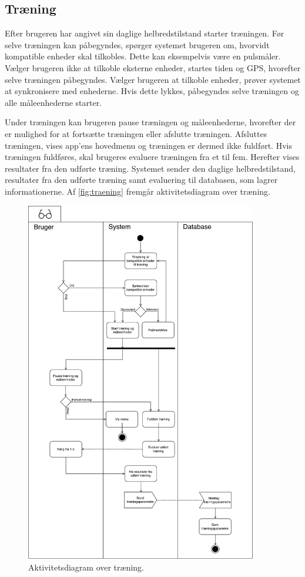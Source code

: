 \subsection{Træning} \label{sec:traening}
Efter brugeren har angivet sin daglige helbredstilstand starter træningen. Før selve træningen kan påbegyndes, spørger systemet brugeren om, hvorvidt kompatible enheder skal tilkobles. Dette kan eksempelvis være en pulsmåler. Vælger brugeren ikke at tilkoble eksterne enheder, startes tiden og GPS, hvorefter selve træningen påbegyndes. Vælger brugeren at tilkoble enheder, prøver systemet at synkronisere med enhederne.  Hvis dette lykkes, påbegyndes selve træningen og alle måleenhederne starter.

Under træningen kan brugeren pause træningen og måleenhederne, hvorefter der er mulighed for at fortsætte træningen eller afslutte træningen. Afsluttes træningen, vises app'ens hovedmenu og træningen er dermed ikke fuldført. 
Hvis træningen fuldføres, skal brugeres evaluere træningen fra et til fem. Herefter vises resultater fra den udførte træning. Systemet sender den daglige helbredstilstand, resultater fra den udførte træning samt evaluering til databasen, som lagrer informationerne. 
Af \autoref{fig:traening} fremgår aktivitetsdiagram over træning.

\begin{figure} [H]
\centering
\includegraphics[width=0.9\textwidth]{figures/aktivitetsdiagram/Traening}
\caption{Aktivitetsdiagram over træning.}
\label{fig:traening}
\end{figure}
